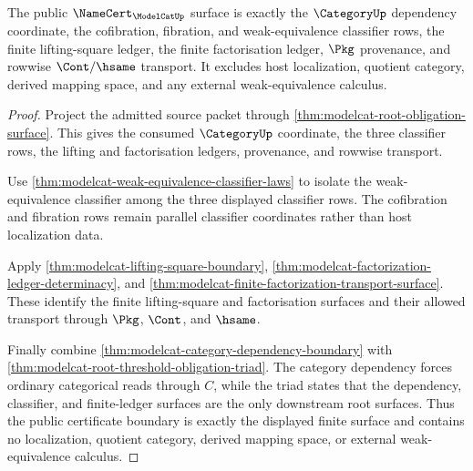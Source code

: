 \begin{theorem}
\label{thm:modelcat-public-certificate-boundary}
The public $\NameCert_{\ModelCatUp}$ surface is exactly the $\CategoryUp$
dependency coordinate, the cofibration, fibration, and weak-equivalence
classifier rows, the finite lifting-square ledger, the finite factorisation
ledger, $\Pkg$ provenance, and rowwise $\Cont/\hsame$ transport. It excludes
host localization, quotient category, derived mapping space, and any external
weak-equivalence calculus.
\end{theorem}
\begin{proof}
Project the admitted source packet through
\autoref{thm:modelcat-root-obligation-surface}. This gives the consumed
$\CategoryUp$ coordinate, the three classifier rows, the lifting and
factorisation ledgers, provenance, and rowwise transport.

Use \autoref{thm:modelcat-weak-equivalence-classifier-laws} to isolate the
weak-equivalence classifier among the three displayed classifier rows. The
cofibration and fibration rows remain parallel classifier coordinates rather
than host localization data.

Apply \autoref{thm:modelcat-lifting-square-boundary},
\autoref{thm:modelcat-factorization-ledger-determinacy}, and
\autoref{thm:modelcat-finite-factorization-transport-surface}. These identify
the finite lifting-square and factorisation surfaces and their allowed
transport through $\Pkg$, $\Cont$, and $\hsame$.

Finally combine
\autoref{thm:modelcat-category-dependency-boundary} with
\autoref{thm:modelcat-root-threshold-obligation-triad}. The category dependency
forces ordinary categorical reads through $C$, while the triad states that the
dependency, classifier, and finite-ledger surfaces are the only downstream root
surfaces. Thus the public certificate boundary is exactly the displayed finite
surface and contains no localization, quotient category, derived mapping space,
or external weak-equivalence calculus.
\end{proof}

